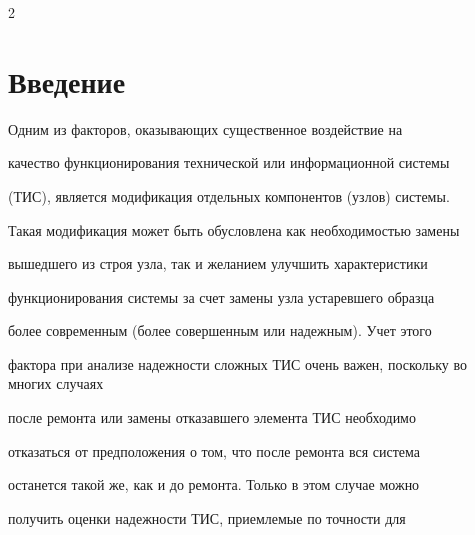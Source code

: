 









      \thispagestyle{headings}





      \begin{multicols}{2}





      \label{st\stat}





\section{Введение}





Одним из факторов, оказывающих существенное воздействие на


качество функционирования технической или информационной системы


(ТИС), является модификация отдельных компонентов (узлов) системы.


Такая модификация может быть обусловлена как необходимостью замены


вышедшего из строя узла, так и желанием улучшить характеристики


функционирования системы за счет замены узла устаревшего образца


более современным (более совершенным или надежным). Учет этого


фактора при анализе надежности сложных ТИС очень важен, поскольку во многих случаях


после ремонта или замены отказавшего элемента ТИС необходимо


отказаться от предположения о том, что после ремонта вся система


останется такой же, как и до ремонта. Только в этом случае можно


получить оценки надежности ТИС, приемлемые по точ\-ности для



\end{multicols}

